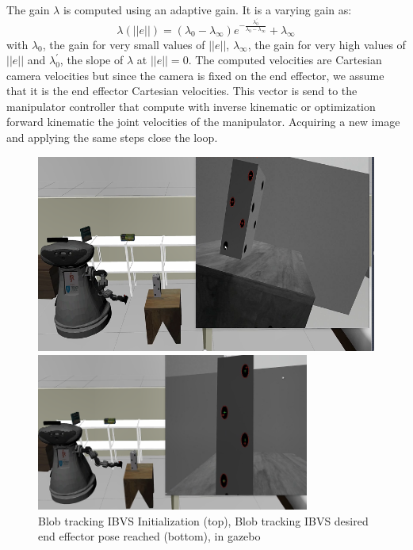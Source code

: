 The gain $\lambda$ is computed using an adaptive gain. It is a varying gain as:
\begin{equation}
    \lambda(||e||)
    = 
    (\lambda_0 - \lambda_\infty)
    e^{-\frac{\lambda_{0}^{'}}{\lambda_0 - \lambda_\infty}}
    + \lambda_\infty
\end{equation}
with $\lambda_0$, the gain for very small values of $||e||$, $\lambda_\infty$, the gain for very high values of $||e||$ and $\lambda_{0}^{'}$, the slope of $\lambda$ at $||e|| = 0$.
The computed velocities are Cartesian camera velocities but since the camera is fixed on the end effector, we assume that it is the end effector Cartesian  velocities. 
This vector is send to the manipulator controller that compute with inverse kinematic or optimization forward kinematic the joint velocities of the manipulator. Acquiring a new image and applying the same steps close the loop.

\begin{figure} [!ht]
    \begin{center}
        \includegraphics[width=0.8\linewidth]{images/blob_tracking.png}
    \end{center}
    \begin{center}
        \includegraphics[width=0.8\textwidth]{images/reach_blob_tracking.png}
    \end{center}
    \caption  {Blob tracking IBVS Initialization (top), Blob tracking IBVS desired end effector pose reached (bottom), in gazebo}
     \label{pict:blob_tracking_reach}
\end{figure}

